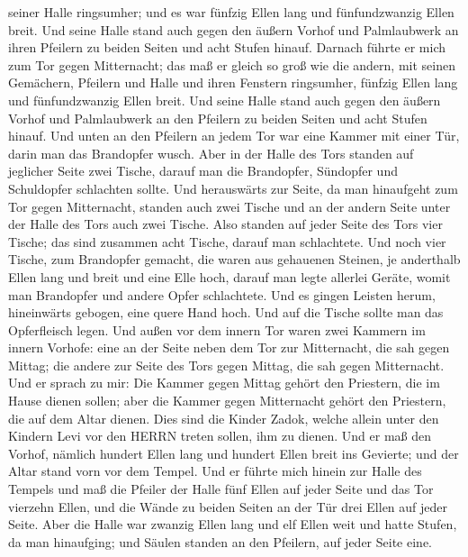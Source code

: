 seiner Halle ringsumher; und es war fünfzig Ellen lang und
fünfundzwanzig Ellen breit.  Und seine Halle stand auch
gegen den äußern Vorhof und Palmlaubwerk an ihren Pfeilern zu beiden
Seiten und acht Stufen hinauf.  Darnach führte er mich zum
Tor gegen Mitternacht; das maß er gleich so groß wie die andern,
 mit seinen Gemächern, Pfeilern und Halle und ihren
Fenstern ringsumher, fünfzig Ellen lang und fünfundzwanzig Ellen breit.
 Und seine Halle stand auch gegen den äußern Vorhof und
Palmlaubwerk an den Pfeilern zu beiden Seiten und acht Stufen hinauf.
 Und unten an den Pfeilern an jedem Tor war eine Kammer mit
einer Tür, darin man das Brandopfer wusch.  Aber in der
Halle des Tors standen auf jeglicher Seite zwei Tische, darauf man die
Brandopfer, Sündopfer und Schuldopfer schlachten sollte. 
Und herauswärts zur Seite, da man hinaufgeht zum Tor gegen Mitternacht,
standen auch zwei Tische und an der andern Seite unter der Halle des
Tors auch zwei Tische.  Also standen auf jeder Seite des
Tors vier Tische; das sind zusammen acht Tische, darauf man schlachtete.
 Und noch vier Tische, zum Brandopfer gemacht, die waren
aus gehauenen Steinen, je anderthalb Ellen lang und breit und eine Elle
hoch, darauf man legte allerlei Geräte, womit man Brandopfer und andere
Opfer schlachtete.  Und es gingen Leisten herum,
hineinwärts gebogen, eine quere Hand hoch. Und auf die Tische sollte man
das Opferfleisch legen.  Und außen vor dem innern Tor waren
zwei Kammern im innern Vorhofe: eine an der Seite neben dem Tor zur
Mitternacht, die sah gegen Mittag; die andere zur Seite des Tors gegen
Mittag, die sah gegen Mitternacht.  Und er sprach zu mir:
Die Kammer gegen Mittag gehört den Priestern, die im Hause dienen
sollen;  aber die Kammer gegen Mitternacht gehört den
Priestern, die auf dem Altar dienen. Dies sind die Kinder Zadok, welche
allein unter den Kindern Levi vor den HERRN treten sollen, ihm zu
dienen.  Und er maß den Vorhof, nämlich hundert Ellen lang
und hundert Ellen breit ins Gevierte; und der Altar stand vorn vor dem
Tempel.  Und er führte mich hinein zur Halle des Tempels
und maß die Pfeiler der Halle fünf Ellen auf jeder Seite und das Tor
vierzehn Ellen, und die Wände zu beiden Seiten an der Tür drei Ellen auf
jeder Seite.  Aber die Halle war zwanzig Ellen lang und elf
Ellen weit und hatte Stufen, da man hinaufging; und Säulen standen an
den Pfeilern, auf jeder Seite eine.

